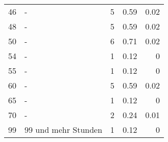 \begin{longtable}{lXrrr}
        46 & \multicolumn{1}{X}{-} & %
          \num{5} &
          \num[round-mode=places,round-precision=2]{0.59} &
          \num[round-mode=places,round-precision=2]{0.02} \\

        48 & \multicolumn{1}{X}{-} & %
          \num{5} &
          \num[round-mode=places,round-precision=2]{0.59} &
          \num[round-mode=places,round-precision=2]{0.02} \\

        50 & \multicolumn{1}{X}{-} & %
          \num{6} &
          \num[round-mode=places,round-precision=2]{0.71} &
          \num[round-mode=places,round-precision=2]{0.02} \\

        54 & \multicolumn{1}{X}{-} & %
          \num{1} &
          \num[round-mode=places,round-precision=2]{0.12} &
          \num[round-mode=places,round-precision=2]{0} \\

        55 & \multicolumn{1}{X}{-} & %
          \num{1} &
          \num[round-mode=places,round-precision=2]{0.12} &
          \num[round-mode=places,round-precision=2]{0} \\

        60 & \multicolumn{1}{X}{-} & %
          \num{5} &
          \num[round-mode=places,round-precision=2]{0.59} &
          \num[round-mode=places,round-precision=2]{0.02} \\

        65 & \multicolumn{1}{X}{-} & %
          \num{1} &
          \num[round-mode=places,round-precision=2]{0.12} &
          \num[round-mode=places,round-precision=2]{0} \\

        70 & \multicolumn{1}{X}{-} & %
          \num{2} &
          \num[round-mode=places,round-precision=2]{0.24} &
          \num[round-mode=places,round-precision=2]{0.01} \\

        99 & \multicolumn{1}{X}{99 und mehr Stunden} & %
          \num{1} &
          \num[round-mode=places,round-precision=2]{0.12} &
          \num[round-mode=places,round-precision=2]{0} \\


\end{longtable}
